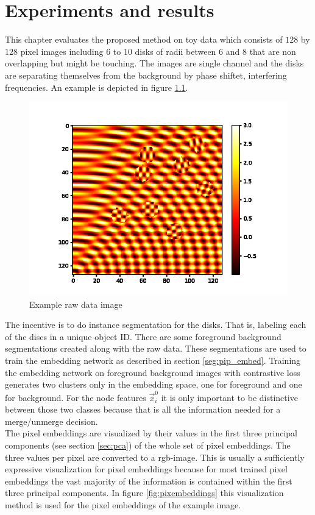 \chapter{Experiments and results}\label{chap:exp_res}
This chapter evaluates the proposed method on toy data which consists of $128$ by $128$ pixel images including $6$ to $10$ disks of radii between $6$ and $8$ that are non overlapping but might be touching. The images are single channel and the disks are separating themselves from the background by phase shiftet, interfering frequencies. An example is depicted in figure \ref{fig:exmpl}.

\begin{figure}[ht!]
	\centering
	\includegraphics[width=.5\textwidth]{figures/plots/raw.png}
	\caption{Example raw data image}
	\label{fig:exmpl}
\end{figure}

The incentive is to do instance segmentation for the disks. That is, labeling each of the discs in a unique object ID. There are some foreground background segmentations created along with the raw data. These segmentations are used to train the embedding network as described in section \ref{seg:pip_embed}. Training the embedding network on foreground background images with contrastive loss generates two clusters only in the embedding space, one for foreground and one for background. For the node features $\vec{x}^0_i$ it is only important to be distinctive between those two classes because that is all the information needed for a merge/unmerge decision.\\
The pixel embeddings are visualized by their values in the first three principal components (see section \ref{sec:pca}) of the whole set of pixel embeddings. The three values per pixel are converted to a rgb-image. This is usually a sufficiently expressive visualization for pixel embeddings because for most trained pixel embeddings the vast majority of the information is contained within the first three principal components. In figure \ref{fig:pixembeddings} this visualization method is used for the pixel embeddings of the example image.\\

